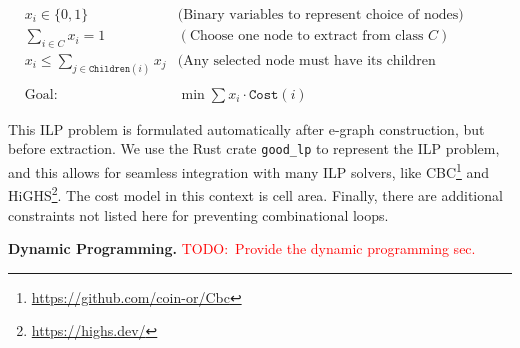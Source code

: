 \documentclass[10pt,letterpaper]{article}
\newcommand{\todo}[1]{\textcolor{red}{TODO:\ #1}}
\begin{document}
\begin{align}
     & x_i \in \{0, 1\} \;\;\;\;                      & \text{(Binary variables to represent choice of nodes)}            & \\
     & \sum_{i \in C} x_i = 1 \;\;\;\;                & (\text{Choose one node to extract from class } C)                 & \\
     & x_i \leq \sum_{j \in \texttt{Children}(i)} x_j & \text{(Any selected node must have its children implemented too)} & \\
    \nonumber                                                                                                               \\
     & \text{Goal: }                                  & \min \sum x_i \cdot \texttt{Cost}(i)                              &
\end{align}

This ILP problem is formulated automatically after e-graph construction, but
before extraction. We use the Rust crate \texttt{good\_lp} to represent the ILP
problem, and this allows for seamless integration with many ILP solvers, like
CBC\footnote{\href{https://github.com/coin-or/Cbc}{https://github.com/coin-or/Cbc}}
and HiGHS\footnote{\href{https://highs.dev/}{https://highs.dev/}}. The cost
model in this context is cell area. Finally, there are additional constraints
not listed here for preventing combinational loops.

\bigbreak{} \noindent \textbf{Dynamic
    Programming.} \todo{Provide the dynamic programming sec.}
\end{document}
